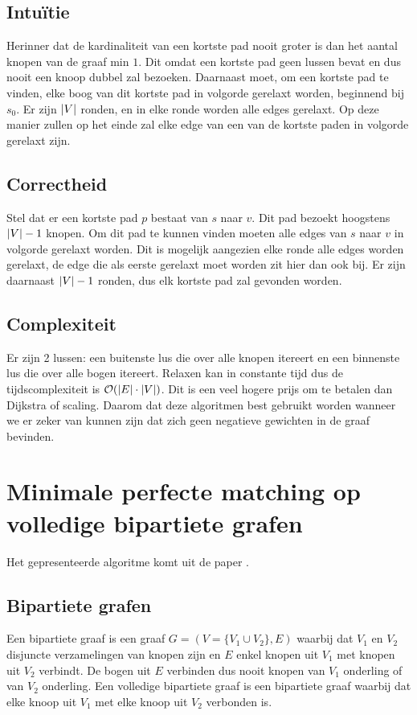\documentclass[conference]{IEEEtran}
\theoremstyle{definition}
\theoremstyle{remark}
\DeclarePairedDelimiter{\card}{\vert}{\vert}  %
\begin{document}
\subsection{Intuïtie}
Herinner dat de kardinaliteit van een kortste pad nooit groter is dan het aantal knopen van de graaf min $1$. Dit omdat een kortste pad geen lussen bevat en dus nooit een knoop dubbel zal bezoeken. Daarnaast moet, om een kortste pad te vinden, elke boog van dit kortste pad in volgorde gerelaxt worden, beginnend bij $s_0$. Er zijn $\card{V}$ ronden, en in elke ronde worden alle edges gerelaxt. Op deze manier zullen op het einde zal elke edge van een van de kortste paden in volgorde gerelaxt zijn.

\subsection{Correctheid}
Stel dat er een kortste pad $p$ bestaat van $s$ naar $v$. Dit pad bezoekt hoogstens $\card{V} - 1$ knopen. Om dit pad te kunnen vinden moeten alle edges van $s$ naar $v$ in volgorde gerelaxt worden. Dit is mogelijk aangezien elke ronde alle edges worden gerelaxt, de edge die als eerste gerelaxt moet worden zit hier dan ook bij. Er zijn daarnaast $\card{V} - 1$ ronden, dus elk kortste pad zal gevonden worden.

\subsection{Complexiteit}
Er zijn 2 lussen: een buitenste lus die over alle knopen itereert en een binnenste lus die over alle bogen itereert. Relaxen kan in constante tijd dus de tijdscomplexiteit is $\mathcal{O}(\card{E} \cdot \card{V})$. Dit is een veel hogere prijs om te betalen dan Dijkstra of scaling. Daarom dat deze algoritmen best gebruikt worden wanneer we er zeker van kunnen zijn dat zich geen negatieve gewichten in de graaf bevinden.


\section{Minimale perfecte matching op volledige bipartiete grafen}
Het gepresenteerde algoritme komt uit de paper  \cite{FasterScaling}.

\subsection{Bipartiete grafen}
Een bipartiete graaf is een graaf $G = (V = \{V_1 \cup V_2\}, E)$ waarbij dat $V_1$ en $V_2$ disjuncte verzamelingen van knopen zijn en $E$ enkel knopen uit $V_1$ met knopen uit $V_2$ verbindt. De bogen uit $E$ verbinden dus nooit knopen van $V_1$ onderling of van $V_2$ onderling. Een volledige bipartiete graaf is een bipartiete graaf waarbij dat elke knoop uit $V_1$ met elke knoop uit $V_2$ verbonden is.
\end{document}
